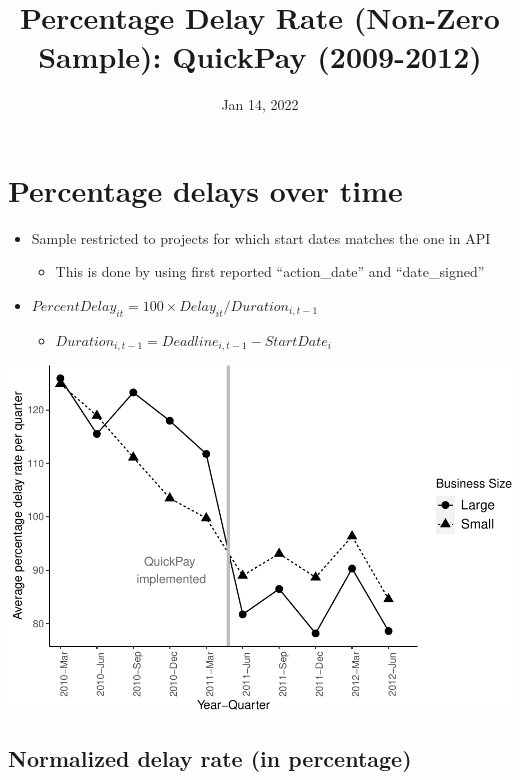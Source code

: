 \documentclass[
]{article}
\title{Percentage Delay Rate (Non-Zero Sample): QuickPay (2009-2012)}
\author{}
\date{\vspace{-2.5em}Jan 14, 2022}
\providecommand{\tightlist}{%
  \setlength{\itemsep}{0pt}\setlength{\parskip}{0pt}}
\begin{document}
\maketitle

\hypertarget{percentage-delays-over-time}{%
\section{Percentage delays over
time}\label{percentage-delays-over-time}}

\begin{itemize}
\tightlist
\item
  Sample restricted to projects for which start dates matches the one in
  API

  \begin{itemize}
  \tightlist
  \item
    This is done by using first reported ``action\_date'' and
    ``date\_signed''
  \end{itemize}
\item
  \(PercentDelay_{it}=100 \times Delay_{it}/Duration_{i,t-1}\)

  \begin{itemize}
  \tightlist
  \item
    \(Duration_{i,t-1} = Deadline_{i,t-1} - StartDate_i\)
  \end{itemize}
\end{itemize}

\includegraphics{qp_first_pc_delay_non_zero_files/figure-latex/plot_pc_delay-1.pdf}

\hypertarget{normalized-delay-rate-in-percentage}{%
\subsection{Normalized delay rate (in
percentage)}\label{normalized-delay-rate-in-percentage}}
\end{document}
